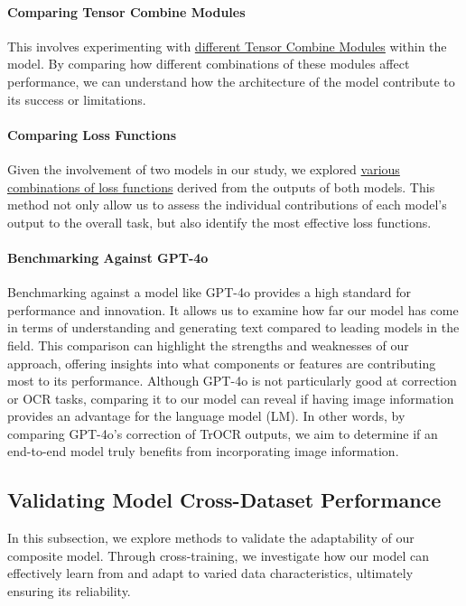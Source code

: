\paragraph*{Comparing Tensor Combine Modules}
\label{par:4_comparing_combined_tensor_modules}
This involves experimenting with \hyperref[par:3_tensor_combine]{different Tensor Combine Modules} within the model. By comparing how different combinations of these modules affect performance, we can understand how the architecture of the model contribute to its success or limitations.

\paragraph*{Comparing Loss Functions}
\label{par:4_comparing_loss_functions}
Given the involvement of two models in our study, we explored \hyperref[par:4_loss_function]{various combinations of loss functions} derived from the outputs of both models. This method not only allow us to assess the individual contributions of each model's output to the overall task, but also identify the most effective loss functions. 

\paragraph*{Benchmarking Against GPT-4o}
\label{par:4_benchmarking_against_gpt-4}
Benchmarking against a model like GPT-4o provides a high standard for performance and innovation. It allows us to examine how far our model has come in terms of understanding and generating text compared to leading models in the field. This comparison can highlight the strengths and weaknesses of our approach, offering insights into what components or features are contributing most to its performance. Although GPT-4o is not particularly good at correction or OCR tasks, comparing it to our model can reveal if having image information provides an advantage for the language model (LM). In other words, by comparing GPT-4o's correction of TrOCR outputs, we aim to determine if an end-to-end model truly benefits from incorporating image information.

\subsection{Validating Model Cross-Dataset Performance}
\label{subsec:5_validating_model_cross_dataset_performance}
In this subsection, we explore methods to validate the adaptability of our composite model. Through cross-training, we investigate how our model can effectively learn from and adapt to varied data characteristics, ultimately ensuring its reliability.

